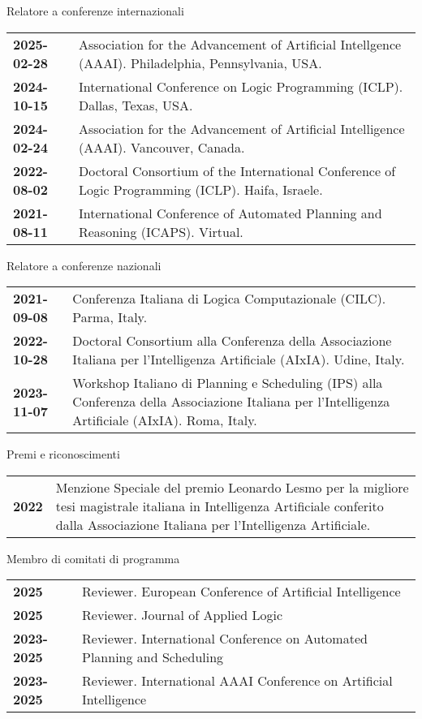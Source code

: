 \documentclass{resume} %
\begin{document}
\begin{rSection}{Relatore a conferenze internazionali}
	\begin{tabularx}{0.95\textwidth} {lp{14cm}}
 \textbf{2025-02-28} & Association for the Advancement of Artificial Intellgence (AAAI). Philadelphia, Pennsylvania, USA.\\
 \textbf{2024-10-15} & International Conference on Logic Programming (ICLP). Dallas, Texas, USA.\\
 \textbf{2024-02-24} & Association for the Advancement of Artificial Intelligence (AAAI). Vancouver, Canada.\\
 \textbf{2022-08-02} & Doctoral Consortium of the International Conference of Logic Programming (ICLP). Haifa, Israele.\\
 \textbf{2021-08-11} & International Conference of Automated Planning and Reasoning (ICAPS). Virtual.\\
 \end{tabularx}
 \end{rSection}
 

 \begin{rSection}{Relatore a conferenze nazionali}
	\begin{tabularx}{0.95\textwidth} {lp{14cm}}
 \textbf{2021-09-08} & Conferenza Italiana di Logica Computazionale (CILC).  Parma, Italy.\\
 \textbf{2022-10-28} & Doctoral Consortium alla Conferenza della Associazione Italiana per l'Intelligenza Artificiale (AIxIA). Udine, Italy.\\
 \textbf{2023-11-07} & Workshop Italiano di Planning e Scheduling (IPS) alla Conferenza della Associazione Italiana per l'Intelligenza Artificiale (AIxIA). Roma, Italy.
  \end{tabularx}
 \end{rSection}
 
 \begin{rSection}{Premi e riconoscimenti}
 \begin{tabularx}{0.95\textwidth} {lp{14cm}}

\textbf{2022}  & Menzione Speciale del premio Leonardo Lesmo per la migliore tesi magistrale italiana in Intelligenza Artificiale conferito dalla Associazione Italiana per l'Intelligenza Artificiale. 
  \end{tabularx}
\end{rSection}


 
  \begin{rSection}{Membro di comitati di programma}
	\begin{tabularx}{0.95\textwidth} {lp{14cm}}
 \textbf{2025} & Reviewer. European Conference of Artificial Intelligence \\
 \textbf{2025} & Reviewer. Journal of Applied Logic \\
 \textbf{2023-2025} & Reviewer. International Conference on Automated Planning and Scheduling \\
 \textbf{2023-2025} & Reviewer. International AAAI Conference on Artificial Intelligence 
  \end{tabularx}
 \end{rSection}
 
\end{document}
